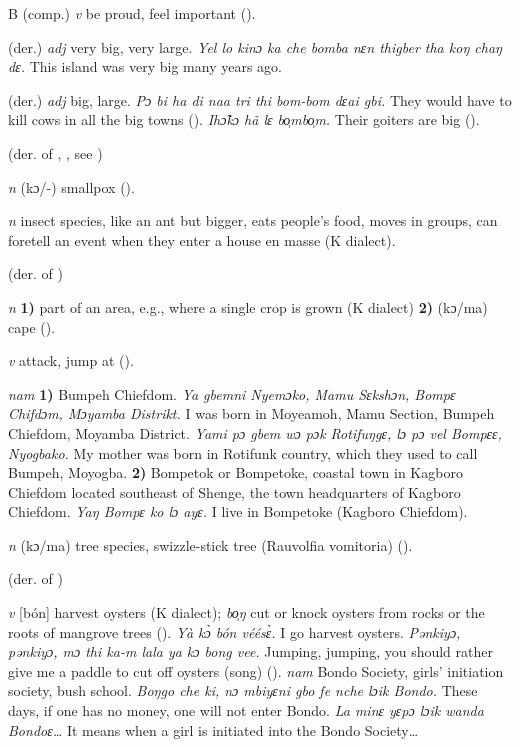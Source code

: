 \begin{letter}{B}
 (comp.) \textit{v} be proud, feel important (\citealt{Pichl1967}).

 (der.) \textit{adj} very big, very large. \textit{Yel lo kinɔ ka che bomba nɛn thigber tha koŋ chaŋ dɛ.} This island was very big many years ago.

 (der.) \textit{adj} big, large. \textit{Pɔ bi ha di naa tri thi bom-bom dɛai gbi.} They would have to kill cows in all the big towns (\citealt{Sumner1921}). \textit{Ihɔ̃kɔ hã lɛ bo̹mbo̹m.} Their goiters are big (\citealt{Pichl1967}). 

 (der. of , , see ) 

 \textit{n} (kɔ/-) smallpox (\citealt{Pichl1967}).

 \textit{n} insect species, like an ant but bigger, eats people's food, moves in groups, can foretell an event when they enter a house en masse (K dialect).

 (der. of ) 

 \textit{n} \textbf{1)} part of an area, e.g., where a single crop is grown (K dialect) \textbf{2)} (kɔ/ma) cape (\citealt{Pichl1967}).

 \textit{v} attack, jump at (\citealt{Pichl1967}). 

 \textit{nam} \textbf{1)} Bumpeh Chiefdom. \textit{Ya gbemni Nyemɔko, Mamu Sɛkshɔn, Bompɛ Chifdɔm, Mɔyamba Distrikt.} I was born in Moyeamoh, Mamu Section, Bumpeh Chiefdom, Moyamba District. \textit{Yami pɔ gbem wɔ pɔk Rotifuŋgɛ, lɔ pɔ vel Bompɛɛ, Nyogbako.} My mother was born in Rotifunk country, which they used to call Bumpeh, Moyogba. \textbf{2)} Bompetok or Bompetoke, coastal town in Kagboro Chiefdom located southeast of Shenge, the town headquarters of Kagboro Chiefdom. \textit{Yaŋ Bompɛ ko lɔ ayɛ.} I live in Bompetoke (Kagboro Chiefdom).

 \textit{n} (kɔ/ma) tree species, swizzle-stick tree (Rauvolfia vomitoria) (\citealt{Pichl1967}). 

 (der. of ) 

 \textit{v} [bón] harvest oysters (K dialect); \textit{bo̹ŋ} cut or knock oysters from rocks or the roots of mangrove trees (\citealt{Pichl1967}). \textit{Yà kɔ̀ bón véésɛ̀.} I go harvest oysters. \textit{ Pənkiyɔ, pənkiyɔ, mɔ thi ka-m lala ya kɔ bong vee.} Jumping, jumping, you should rather give me a paddle to cut off oysters (song) (\citealt{Pichl1967}). 
 \textit{nam} Bondo Society, girls' initiation society, bush school. \textit{Boŋgo che ki, nɔ mbiyɛni gbo fe nche lɔik Bondo.} These days, if one has no money, one will not enter Bondo. \textit{La minɛ yɛpɔ lɔik wanda Bondoɛ…} It means when a girl is initiated into the Bondo Society…


\end{letter}

